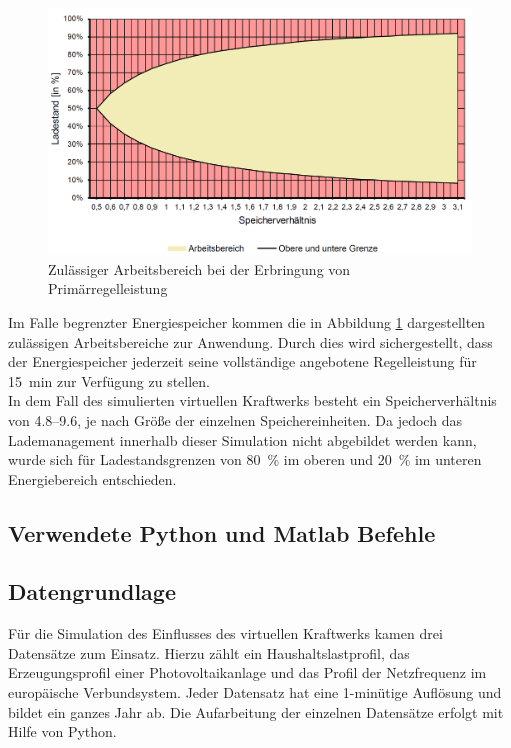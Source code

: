 \begin{figure}[H]
	\begin{center}
		\includegraphics[width=\textwidth]{Bilder/P-E_factor.png}
		\caption{Zulässiger Arbeitsbereich bei der Erbringung von Primärregelleistung \parencite[s. S. 61][]{regel_PQ}}
		\label{fig:P_E_factor}
	\end{center}
\end{figure}

\noindent Im Falle begrenzter Energiespeicher kommen die in Abbildung \ref{fig:P_E_factor} dargestellten zulässigen Arbeitsbereiche zur Anwendung. Durch dies wird sichergestellt, dass der Energiespeicher jederzeit seine vollständige angebotene Regelleistung für \SI{15}{\minute} zur Verfügung zu stellen.\medskip\\
In dem Fall des simulierten virtuellen Kraftwerks besteht ein Speicherverhältnis von \SIrange{4.8}{9.6}{}, je nach Größe der einzelnen Speichereinheiten. Da jedoch das Lademanagement innerhalb dieser Simulation nicht abgebildet werden kann, wurde sich für Ladestandsgrenzen von \SI{80}{\percent} im oberen und \SI{20}{\percent} im unteren Energiebereich entschieden.

\subsection{Verwendete Python und Matlab Befehle}


\subsection{Datengrundlage}

Für die Simulation des Einflusses des virtuellen Kraftwerks kamen drei Datensätze zum Einsatz. Hierzu zählt ein Haushaltslastprofil, das Erzeugungsprofil einer Photovoltaikanlage und das Profil der Netzfrequenz im europäische Verbundsystem. Jeder Datensatz hat eine 1-minütige Auflösung und bildet ein ganzes Jahr ab. Die Aufarbeitung der einzelnen Datensätze erfolgt mit Hilfe von Python.

